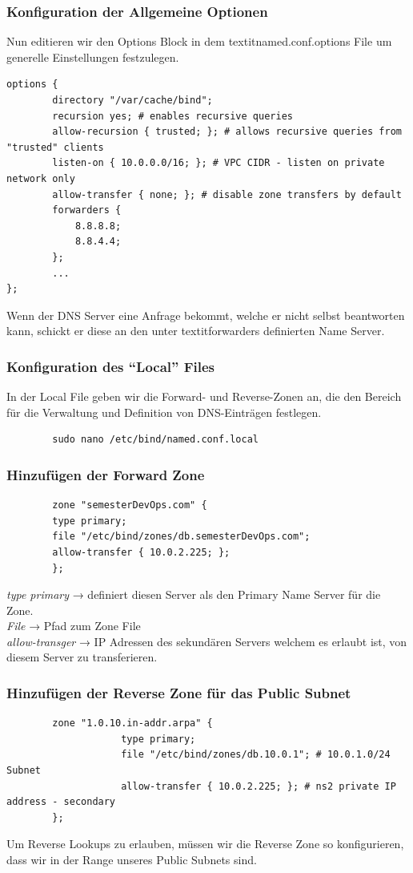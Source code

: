 \documentclass[a4paper,12pt]{article}
\begin{document}
\subsubsection{Konfiguration der Allgemeine Optionen}
Nun editieren wir den Options Block in dem textit{named.conf.options} File um generelle Einstellungen festzulegen.
\begin{verbatim}
options {
		directory "/var/cache/bind";
		recursion yes; # enables recursive queries
		allow-recursion { trusted; }; # allows recursive queries from "trusted" clients
		listen-on { 10.0.0.0/16; }; # VPC CIDR - listen on private network only
		allow-transfer { none; }; # disable zone transfers by default
		forwarders {
			8.8.8.8;
			8.8.4.4;
		};
		...
};
\end{verbatim}
Wenn der DNS Server eine Anfrage bekommt, welche er nicht selbst beantworten kann, schickt er diese an den unter textit{forwarders} definierten Name Server.


\subsubsection{Konfiguration des “Local” Files}
In der Local File geben wir die Forward- und Reverse-Zonen an, die den Bereich für die Verwaltung und Definition von DNS-Einträgen festlegen.
\begin{verbatim}
		sudo nano /etc/bind/named.conf.local
\end{verbatim}

\subsubsection{Hinzufügen der Forward Zone}
\begin{verbatim}
		zone "semesterDevOps.com" {
		type primary;
		file "/etc/bind/zones/db.semesterDevOps.com"; 
		allow-transfer { 10.0.2.225; };
		};
\end{verbatim}
\textit{type primary} → definiert diesen Server als den Primary Name Server für die Zone. \\
\textit{File} → Pfad zum Zone File \\
\textit{allow-transger} → IP Adressen des sekundären Servers welchem es erlaubt ist, von diesem Server zu transferieren. \\


\subsubsection{Hinzufügen der Reverse Zone für das Public Subnet}
\begin{verbatim}
		zone "1.0.10.in-addr.arpa" {
					type primary;
					file "/etc/bind/zones/db.10.0.1"; # 10.0.1.0/24 Subnet
					allow-transfer { 10.0.2.225; }; # ns2 private IP address - secondary
		};
\end{verbatim}
Um Reverse Lookups zu erlauben, müssen wir die Reverse Zone so konfigurieren, dass wir in der Range unseres Public Subnets sind.
\end{document}

